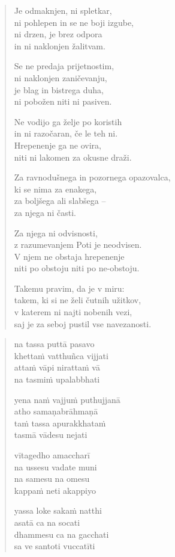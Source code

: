 \clearpage
\begin{verse}

Je odmaknjen, ni spletkar,\\
ni pohlepen in se ne boji izgube,\\
ni drzen, je brez odpora\\
in ni naklonjen žalitvam.

Se ne predaja prijetnostim,\\
ni naklonjen zaničevanju,\\
je blag in bistrega duha,\\
ni pobožen niti ni pasiven.

Ne vodijo ga želje po koristih\\
in ni razočaran, če le teh ni.\\
Hrepenenje ga ne ovira,\\
niti ni lakomen za okusne draži.

Za ravnodušnega in pozornega opazovalca,\\
ki se nima za enakega,\\
za boljšega ali slabšega --\\
za njega ni časti.

Za njega ni odvisnosti,\\
z razumevanjem Poti je neodvisen.\\
V njem ne obstaja hrepenenje\\
niti po obstoju niti po ne-obstoju.

Takemu pravim, da je v miru:\\
takem, ki si ne želi čutnih užitkov,\\
v katerem ni najti nobenih vezi,\\
saj je za seboj pustil vse navezanosti.

\end{verse}


\clearpage
\begin{verse}

na tassa puttā pasavo\\
khettaṁ vatthuñca vijjati\\
attaṁ vāpi nirattaṁ vā\\
na tasmiṁ upalabbhati

yena naṁ vajjuṁ puthujjanā\\
atho samaṇabrāhmaṇā\\
taṁ tassa apurakkhataṁ\\
tasmā vādesu nejati

vītagedho amaccharī\\
na ussesu vadate muni\\
na samesu na omesu\\
kappaṁ neti akappiyo

yassa loke sakaṁ natthi\\
asatā ca na socati\\
dhammesu ca na gacchati\\
sa ve santoti vuccatīti

\end{verse}

